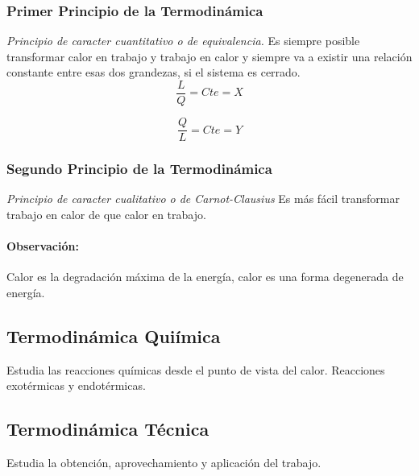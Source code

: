 		\subsubsection{Primer Principio de la Termodin\'amica}
		\emph{Principio de caracter cuantitativo o de equivalencia.}
		Es siempre posible transformar calor en trabajo y trabajo en calor 
		y siempre va a existir una relaci\'on constante entre esas dos grandezas, 
		si el sistema es cerrado.
			\[
				\frac{L}{Q} = Cte = X
			\]

			\[
				\frac{Q}{L} = Cte = Y 
			\]

		\subsubsection{Segundo Principio de la Termodin\'amica}
		\emph{Principio de caracter cualitativo o de Carnot-Clausius}
		Es m\'as f\'acil transformar trabajo en calor de que calor en trabajo.
			\paragraph{Observaci\'on:} 
			Calor es la degradaci\'on m\'axima de la 
			energ\'ia, calor es una forma degenerada de energ\'ia.

	\subsection{Termodin\'amica Qui\'imica}	
	Estudia las reacciones qu\'imicas desde el punto de vista del calor. Reacciones
	exot\'ermicas y endot\'ermicas.

	\subsection{Termodin\'amica T\'ecnica}
	Estudia la obtenci\'on, aprovechamiento y aplicaci\'on del trabajo.




